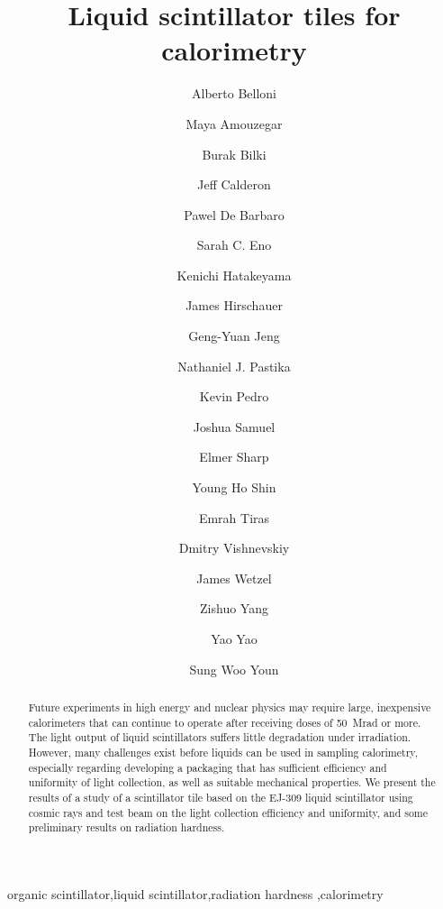\documentclass[review]{elsarticle}
\begin{document}
\begin{frontmatter}

\title{Liquid scintillator tiles for calorimetry}


\author[umd]{Alberto Belloni}
\author[umd]{Maya Amouzegar}
\author[iowa]{Burak Bilki}
\author[umd]{Jeff Calderon}
\author[rochester]{Pawel De Barbaro}
\author[umd]{Sarah C. Eno}
\author[baylor]{Kenichi Hatakeyama}
\author[fnal]{James Hirschauer}
\author[umd]{Geng-Yuan Jeng}
\author[baylor]{Nathaniel J. Pastika}
\author[fnal]{Kevin Pedro}
\author[umd]{Joshua Samuel}
\author[elmer]{Elmer Sharp}
\author[umd]{Young Ho Shin}
\author[iowa]{Emrah Tiras}
\author[rochester]{Dmitry Vishnevskiy}
\author[iowa]{James Wetzel}
\author[umd]{Zishuo Yang}
\author[umd]{Yao Yao}
\author[korea]{Sung Woo Youn}




\address[umd]{Dept. Physics, U. Maryland, College Park, MD, USA}
\address[korea]{Dept. Physics, Institute for Basic Science, Center for Axion and Precision Physics Research, Yuseong-gu, Daejeon 305-701, South Korea}
\address[elmer]{Elmer Sharp Engineering, 7007 Leesville Blvd. Springfield, VA 22151}
\address[fnal]{Fermi National Accelerator Laboratory, Batavia, IL, USA}
\address[baylor]{Dept. Physics, Baylor University, Waco, Texas, USA}
\address[iowa]{Dept. Physics, The University of Iowa, Iowa City, IA, USA}
\address[rochester]{Dept. Physics, The University of Rochester, Rochester, NY, USA}

\begin{abstract}
Future experiments in high energy and nuclear physics may require
large, inexpensive calorimeters that can continue to
operate after receiving doses of 50~Mrad
or more. The light output of liquid scintillators suffers little
degradation under irradiation.  However, many challenges exist
before  liquids can be used in sampling calorimetry,
especially regarding developing
a packaging that has sufficient efficiency and uniformity of light collection,
as well as
suitable mechanical properties.
We present the results of a study of a scintillator tile
based on the EJ-309 liquid scintillator using cosmic rays and test beam
on the light collection efficiency and uniformity, and some preliminary results
on radiation hardness.
\end{abstract}

\begin{keyword}
organic scintillator\sep liquid scintillator\sep radiation
hardness \sep calorimetry
\end{keyword}

\end{frontmatter}
\end{document}
